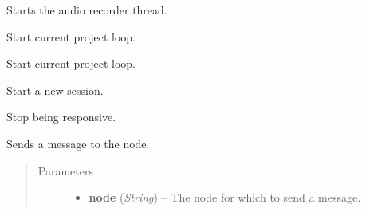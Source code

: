 \documentclass[letterpaper,10pt,english]{sphinxmanual}
\begin{document}
\begin{fulllineitems}
\begin{fulllineitems}
\end{fulllineitems}


\begin{fulllineitems}
\label{state:state.State.start_audio_recorder}
Starts the audio recorder thread.

\end{fulllineitems}


\begin{fulllineitems}
\label{state:state.State.start_current_project_thread}
Start current project loop.

\end{fulllineitems}


\begin{fulllineitems}
\label{state:state.State.start_current_session_thread}
Start current project loop.

\end{fulllineitems}


\begin{fulllineitems}
\label{state:state.State.start_new_session}
Start a new session.

\end{fulllineitems}


\begin{fulllineitems}
\label{state:state.State.stop_responsive}
Stop being responsive.

\end{fulllineitems}


\begin{fulllineitems}
\label{state:state.State.swnp_send}
Sends a message to the node.
\begin{quote}\begin{description}
\item[{Parameters}] \leavevmode\begin{itemize}
\item {} 
\textbf{node} (\emph{String}) -- The node for which to send a message.


\end{itemize}
\end{description}
\end{quote}
\end{fulllineitems}
\end{fulllineitems}
\end{document}
